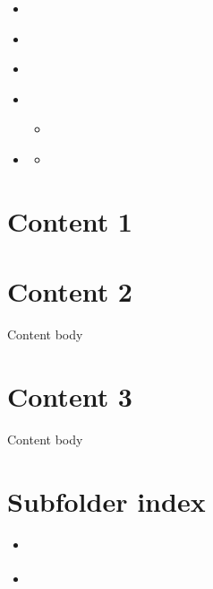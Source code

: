 

\pagestyle{empty}
\sphinxmaketitle
\pagestyle{plain}
\sphinxtableofcontents
\pagestyle{normal}
\label{\detokenize{index::doc}}


\begin{itemize}
\item{}{\hyperref[\detokenize{content1::doc}]{}}

\item{}{\hyperref[\detokenize{content2::doc}]{}}

\item{}{\hyperref[\detokenize{content3::doc}]{}}

\item{} 

\item{}{\hyperref[\detokenize{subfolder/index::doc}]{}}

\begin{itemize}
\item{}{\hyperref[\detokenize{subfolder/asubpage::doc}]{}}

\item{} 

\end{itemize}
\end{itemize}


\chapter{Content 1}
\label{\detokenize{content1:content-1}}\label{\detokenize{content1::doc}}

\chapter{Content 2}
\label{\detokenize{content2:content-2}}\label{\detokenize{content2::doc}}
Content body


\chapter{Content 3}
\label{\detokenize{content3:content-3}}\label{\detokenize{content3::doc}}
Content body


\chapter{Subfolder index}
\label{\detokenize{subfolder/index:subfolder-index}}\label{\detokenize{subfolder/index::doc}}
\begin{itemize}
\item{}{\hyperref[\detokenize{subfolder/asubpage::doc}]{}}

\item{} 

\end{itemize}


